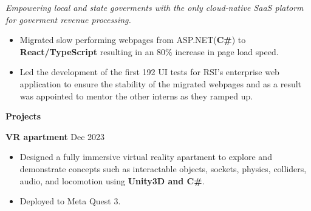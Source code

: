 \documentclass[10pt]{article}
\begin{document}
\textit{Empowering local and state goverments with the only cloud-native SaaS platorm for goverment revenue processing.}

\vspace{1pt}

\begin{itemize}[noitemsep]
    \item Migrated slow performing webpages from ASP.NET(\textbf{C\#}) to \textbf{React/TypeScript} resulting in an 80\% increase in page load speed.
    \item Led the development of the first 192 UI tests for RSI's enterprise web application to ensure the stability of the migrated webpages and as a result was appointed to mentor the other interns as they ramped up.
\end{itemize}



\begin{center}
    \textbf{Projects}
    \hrulefill
\end{center}

\textbf{VR apartment} \hfill Dec 2023
\begin{itemize}[noitemsep]
    \item Designed a fully immersive virtual reality apartment to explore and demonstrate concepts such as interactable objects,
    sockets, physics, colliders, audio, and locomotion using \textbf{Unity3D and C\#}. 
    \item Deployed to Meta Quest 3.
\end{itemize}
\end{document}
